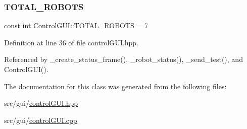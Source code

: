 \mbox{\label{class_control_g_u_i_a5a2c1a15c09444b56794705721ba73fa}} 
\subsubsection{\texorpdfstring{T\+O\+T\+A\+L\+\_\+\+R\+O\+B\+O\+TS}{TOTAL\_ROBOTS}}
{\footnotesize\ttfamily const int Control\+G\+U\+I\+::\+T\+O\+T\+A\+L\+\_\+\+R\+O\+B\+O\+TS = 7\hspace{0.3cm}{\ttfamily [static]}}



Definition at line 36 of file control\+G\+U\+I.\+hpp.



Referenced by \+\_\+create\+\_\+status\+\_\+frame(), \+\_\+robot\+\_\+status(), \+\_\+send\+\_\+test(), and Control\+G\+U\+I().



The documentation for this class was generated from the following files\+:\begin{DoxyCompactItemize}
\item 
src/gui/\hyperlink{control_g_u_i_8hpp}{control\+G\+U\+I.\+hpp}\item 
src/gui/\hyperlink{control_g_u_i_8cpp}{control\+G\+U\+I.\+cpp}\end{DoxyCompactItemize}
